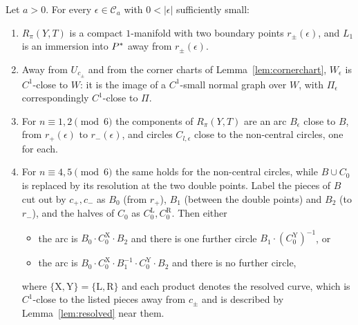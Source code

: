 \begin{proposition}\label{prop:global}
Let $a>0$. For every $\epsilon\in\mathcal C_a$ with $0<|\epsilon|$ sufficiently small:
\begin{enumerate}
\item $R_\pi(Y,T)$ is a compact $1$-manifold with two boundary points $r_\pm(\epsilon)$, and $L_1$ is an immersion
into $P^{*}$ away from $r_\pm(\epsilon)$.
\item Away from $U_{c_\pm}$ and from the corner charts of Lemma~\ref{lem:cornerchart}, $W_\epsilon$ is $C^1$-close to $W$:
it is the image of a $C^1$-small normal graph over $W$, with $\Pi_\epsilon$ correspondingly $C^1$-close to $\Pi$.
\item For $n\equiv1,2\pmod 6$ the components of $R_\pi(Y,T)$ are an arc $B_\epsilon$ close to $B$, from $r_+(\epsilon)$ to
$r_-(\epsilon)$, and circles $C_{l,\epsilon}$ close to the non-central circles, one for each.
\item For $n\equiv4,5\pmod6$ the same holds for the non-central circles, while $B\cup C_0$ is replaced by its resolution
at the two double points. Label the pieces of $B$ cut out by $c_+,c_-$ as $B_0$ (from $r_+$), $B_1$ (between
the double points) and $B_2$ (to $r_-$), and the halves of $C_0$ as $C_0^{\mathrm L},C_0^{\mathrm R}$. Then either
\begin{itemize}
\item the arc is $B_0\cdot C_0^{\mathrm X}\cdot B_2$ and there is one further circle $B_1\cdot(C_0^{\mathrm Y})^{-1}$, or
\item the arc is $B_0\cdot C_0^{\mathrm X}\cdot B_1^{-1}\cdot C_0^{\mathrm Y}\cdot B_2$ and there is no further circle,
\end{itemize}
where $\{\mathrm X,\mathrm Y\}=\{\mathrm L,\mathrm R\}$ and each product denotes the resolved curve, which is $C^1$-close to the listed
pieces away from $c_\pm$ and is described by Lemma~\ref{lem:resolved} near them.
\end{enumerate}
\end{proposition}


